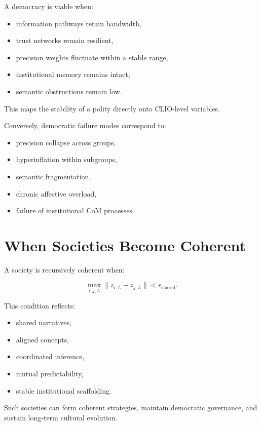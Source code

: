 \documentclass[12pt,oneside]{book}
\theoremstyle{plain}
\theoremstyle{definition}
\begin{document}
A democracy is viable when:

\begin{itemize}
    \item information pathways retain bandwidth,
    \item trust networks remain resilient,
    \item precision weights fluctuate within a stable range,
    \item institutional memory remains intact,
    \item semantic obstructions remain low.
\end{itemize}

This maps the stability of a polity directly onto CLIO-level variables.

Conversely, democratic failure modes correspond to:

\begin{itemize}
    \item precision collapse across groups,
    \item hyperinflation within subgroups,
    \item semantic fragmentation,
    \item chronic affective overload,
    \item failure of institutional CoM processes.
\end{itemize}

\section{When Societies Become Coherent}

A society is recursively coherent when:

\[
\max_{i,j,L}
\lVert z_{i,L} - z_{j,L} \rVert
< \epsilon_{\mathrm{shared}}.
\]

This condition reflects:

\begin{itemize}
    \item shared narratives,
    \item aligned concepts,
    \item coordinated inference,
    \item mutual predictability,
    \item stable institutional scaffolding.
\end{itemize}

Such societies can form coherent strategies, maintain democratic governance, 
and sustain long-term cultural evolution.
\end{document}
